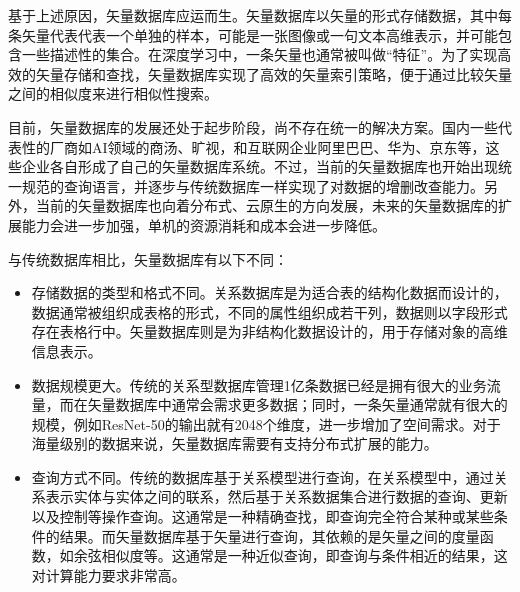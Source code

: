 基于上述原因，矢量数据库应运而生。矢量数据库以矢量的形式存储数据，其中每条矢量代表代表一个单独的样本，可能是一张图像或一句文本高维表示，并可能包含一些描述性的集合。在深度学习中，一条矢量也通常被叫做“特征”。为了实现高效的矢量存储和查找，矢量数据库实现了高效的矢量索引策略，便于通过比较矢量之间的相似度来进行相似性搜索。

目前，矢量数据库的发展还处于起步阶段，尚不存在统一的解决方案。国内一些代表性的厂商如AI领域的商汤、旷视，和互联网企业阿里巴巴、华为、京东等，这些企业各自形成了自己的矢量数据库系统。不过，当前的矢量数据库也开始出现统一规范的查询语言，并逐步与传统数据库一样实现了对数据的增删改查能力。另外，当前的矢量数据库也向着分布式、云原生的方向发展，未来的矢量数据库的扩展能力会进一步加强，单机的资源消耗和成本会进一步降低。

与传统数据库相比，矢量数据库有以下不同：

\begin{itemize}
\item 存储数据的类型和格式不同。关系数据库是为适合表的结构化数据而设计的，数据通常被组织成表格的形式，不同的属性组织成若干列，数据则以字段形式存在表格行中。矢量数据库则是为非结构化数据设计的，用于存储对象的高维信息表示。

\item 数据规模更大。传统的关系型数据库管理1亿条数据已经是拥有很大的业务流量，而在矢量数据库中通常会需求更多数据；同时，一条矢量通常就有很大的规模，例如ResNet-50的输出就有2048个维度，进一步增加了空间需求。对于海量级别的数据来说，矢量数据库需要有支持分布式扩展的能力。

\item 查询方式不同。传统的数据库基于关系模型进行查询，在关系模型中，通过关系表示实体与实体之间的联系，然后基于关系数据集合进行数据的查询、更新以及控制等操作查询。这通常是一种精确查找，即查询完全符合某种或某些条件的结果。而矢量数据库基于矢量进行查询，其依赖的是矢量之间的度量函数，如余弦相似度等。这通常是一种近似查询，即查询与条件相近的结果，这对计算能力要求非常高。
\end{itemize}